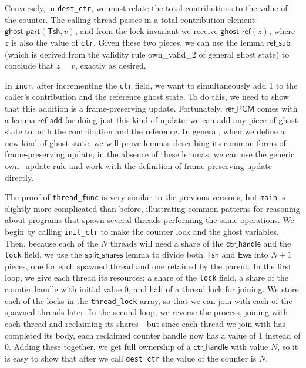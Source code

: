 \documentclass[11pt]{article}
\begin{document}
Conversely, in \texttt{dest\_ctr}, we must relate the total contributions to the value of the counter. The calling thread passes in a total contribution element $\mathsf{ghost\_part}(\mathsf{Tsh}, v)$, and from the lock invariant we receive $\mathsf{ghost\_ref}(z)$, where $z$ is also the value of \texttt{ctr}. Given these two pieces, we can use the lemma $\mathsf{ref\_sub}$ (which is derived from the validity rule \textsf{own\_valid\_2} of general ghost state) to conclude that $z = v$, exactly as desired. %

In \texttt{incr}, after incrementing the \texttt{ctr} field, we want to simultaneously add 1 to the caller's contribution and the reference ghost state. To do this, we need to show that this addition is a frame-preserving update. Fortunately, $\mathsf{ref\_PCM}$ comes with a lemma $\mathsf{ref\_add}$ for doing just this kind of update: we can add any piece of ghost state to both the contribution and the reference. In general, when we define a new kind of ghost state, we will prove lemmas describing its common forms of frame-preserving update; in the absence of these lemmas, we can use the generic \textsf{own\_update} rule and work with the definition of frame-preserving update directly.

The proof of \texttt{thread\_func} is very similar to the previous versions, but \texttt{main} is slightly more complicated than before, illustrating common patterns for reasoning about programs that spawn several threads performing the same operations. We begin by calling \texttt{init\_ctr} to make the counter lock and the ghost variables. Then, because each of the $N$ threads will need a share of the $\mathsf{ctr\_handle}$ and the \texttt{lock} field, we use the $\mathsf{split\_shares}$ lemma to divide both $\mathsf{Tsh}$ and $\mathsf{Ews}$ into $N + 1$ pieces, one for each spawned thread and one retained by the parent. In the first loop, we give each thread its resources: a share of the \texttt{lock} field, a share of the counter handle with initial value 0, and half of a thread lock for joining. We store each of the locks in the \texttt{thread\_lock} array, so that we can join with each of the spawned threads later. In the second loop, we reverse the process, joining with each thread and reclaiming its shares---but since each thread we join with has completed its body, each reclaimed counter handle now has a value of 1 instead of 0. Adding these together, we get full ownership of a $\mathsf{ctr\_handle}$ with value $N$, so it is easy to show that after we call \texttt{dest\_ctr} the value of the counter is $N$.
\end{document}
